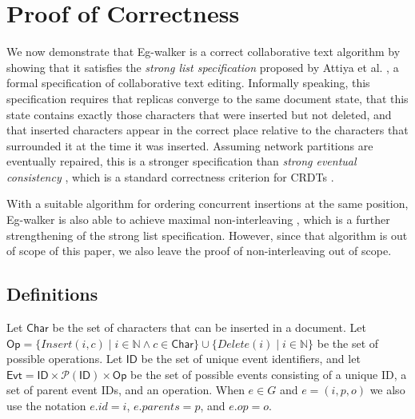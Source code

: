 \documentclass[sigplan,10pt]{acmart}
\newcommand{\algname}{Eg-walker\xspace}
\begin{document}
\clearpage
\section{Proof of Correctness}\label{proofs}

We now demonstrate that \algname is a correct collaborative text algorithm by showing that it satisfies the \emph{strong list specification} proposed by Attiya et al. \cite{Attiya2016}, a formal specification of collaborative text editing.
Informally speaking, this specification requires that replicas converge to the same document state, that this state contains exactly those characters that were inserted but not deleted, and that inserted characters appear in the correct place relative to the characters that surrounded it at the time it was inserted.
Assuming network partitions are eventually repaired, this is a stronger specification than \emph{strong eventual consistency} \cite{Shapiro2011}, which is a standard correctness criterion for CRDTs \cite{Gomes2017verifying}.

With a suitable algorithm for ordering concurrent insertions at the same position, \algname is also able to achieve maximal non-interleaving \cite{fugue}, which is a further strengthening of the strong list specification.
However, since that algorithm is out of scope of this paper, we also leave the proof of non-interleaving out of scope.

\subsection{Definitions}

Let $\mathsf{Char}$ be the set of characters that can be inserted in a document.
Let $\mathsf{Op} = \{\mathit{Insert}(i, c) \mid i \in \mathbb{N} \wedge c \in \mathsf{Char}\} \cup \{\mathit{Delete}(i) \mid i \in \mathbb{N}\}$ be the set of possible operations.
Let $\mathsf{ID}$ be the set of unique event identifiers, and let $\mathsf{Evt} = \mathsf{ID} \times \mathcal{P}(\mathsf{ID}) \times \mathsf{Op}$ be the set of possible events consisting of a unique ID, a set of parent event IDs, and an operation.
When $e \in G$ and $e = (i,p,o)$ we also use the notation $e.\mathit{id} = i$, $e.\mathit{parents} = p$, and $e.\mathit{op} = o$.
\end{document}
